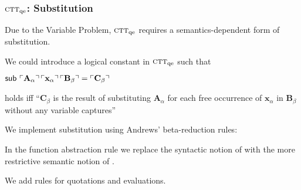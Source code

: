 \documentclass[t,12pt,numbers,fleqn]{beamer}
\newcommand{\churchqe}{$\mbox{\sc ctt}_{\rm qe}$}
\begin{document}
\begin{frame}
\frametitle{{\churchqe}: Substitution}
\bi

  \item Due to the Variable Problem, {\churchqe} requires a
    semantics-dependent form of substitution.

\pause

  \item We could introduce a logical constant  in {\churchqe}
    such that

  \bi

    \item[] $\mbox{\sf sub}\,\, \ulcorner\textbf{A}_\alpha\urcorner \,
      \ulcorner\textbf{x}_\alpha\urcorner \, \ulcorner\textbf{B}_\beta\urcorner =
     \ulcorner\textbf{C}_\beta\urcorner$

  \ei

  holds iff ``$\textbf{C}_\beta$ is the result of substituting
  $\textbf{A}_\alpha$ for each free occurrence of $\textbf{x}_\alpha$
  in $\textbf{B}_\beta$ without any variable captures''\\ 

\pause

  \item We implement substitution using Andrews' beta-reduction rules:

  \bi

    \item In the function abstraction rule we replace the
      syntactic notion of  with the more restrictive semantic notion of
      .

    \item We add rules for quotations and evaluations.

  \ei

\pause

  \item {}

\ei
\end{frame}

\end{document}
